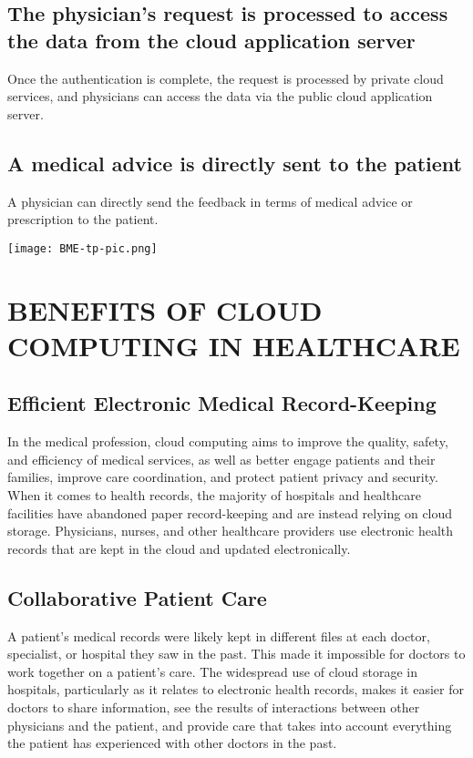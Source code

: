 \documentclass[12pt]{article}
\begin{document}
\subsection{The physician’s request is processed to access the data from the cloud application server}
Once the authentication is complete, the request is processed by private cloud services, and physicians can access the data via the public cloud application server.

\subsection{A medical advice is directly sent to the patient}
A physician can directly send the feedback in terms of medical advice or prescription to the patient.

\indent


\texttt{[image: BME-tp-pic.png]}

\section{BENEFITS OF CLOUD COMPUTING IN HEALTHCARE}

\subsection{Efficient Electronic Medical Record-Keeping}
In the medical profession, cloud computing aims to improve the quality, safety, and efficiency of medical services, as well as better engage patients and their families, improve care coordination, and protect patient privacy and security. When it comes to health records, the majority of hospitals and healthcare facilities have abandoned paper record-keeping and are instead relying on cloud storage. Physicians, nurses, and other healthcare providers use electronic health records that are kept in the cloud and updated electronically.

\subsection{Collaborative Patient Care}
A patient's medical records were likely kept in different files at each doctor, specialist, or hospital they saw in the past. This made it impossible for doctors to work together on a patient's care. The widespread use of cloud storage in hospitals, particularly as it relates to electronic health records, makes it easier for doctors to share information, see the results of interactions between other physicians and the patient, and provide care that takes into account everything the patient has experienced with other doctors in the past.
\end{document}
